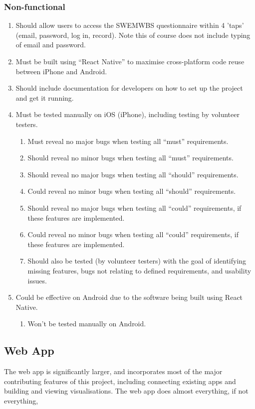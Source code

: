 \documentclass[11pt,openright,a4paper]{report}
\begin{document}
\subsubsection{Non-functional}
\begin{enumerate}
\item Should allow users to access the SWEMWBS questionnaire within 4 'taps' (email, password, log in, record). Note this of course does not include typing of email and password.
\item Must be built using \enquote{React Native} \parencite{reactnative} \parencite{reactnativegit} to maximise cross-platform code reuse between iPhone and Android.
\item Should include documentation for developers on how to set up the project and get it running.
\item Must be tested manually on iOS (iPhone), including testing by volunteer testers.
  \begin{enumerate}
  \item Must reveal no major bugs when testing all \enquote{must} requirements.
  \item Should reveal no minor bugs when testing all \enquote{must} requirements.
  \item Should reveal no major bugs when testing all \enquote{should} requirements.
  \item Could reveal no minor bugs when testing all \enquote{should} requirements.
  \item Should reveal no major bugs when testing all \enquote{could} requirements, if these features are implemented.
  \item Could reveal no minor bugs when testing all \enquote{could} requirements, if these features are implemented.
  \item Should also be tested (by volunteer testers) with the goal of identifying missing features, bugs not relating to defined requirements, and usability issues.
  \end{enumerate}
\item Could be effective on Android due to the software being built using React Native.
  \begin{enumerate}
  \item Won't be tested manually on Android.
  \end{enumerate}
\end{enumerate}

\subsection{Web App}
The web app is significantly larger, and incorporates most of the major contributing features of this project, including connecting existing apps and building and viewing visualisations. The web app does almost everything, if not everything,%
\end{document}
